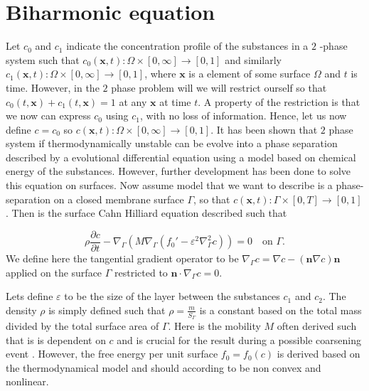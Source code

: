 
\newpage
\section{Biharmonic equation}%
\label{sec:cahn_hilliard_equation}


Let $c_0$ and $c_1$  indicate the concentration profile of the substances in a $2$ -phase system such
that $c_0 \left( \mathbf{x},t \right): \Omega  \times \left[ 0, \infty \right] \to \left[ 0,1 \right]$ and
similarly $c_1 \left( \mathbf{x},t \right): \Omega \times \left[ 0, \infty \right] \to \left[ 0,1 \right]$, where
$\mathbf{x} $ is a element of some surface $\Omega $ and $t$ is time.
However, in the $2$ phase problem will we will restrict ourself so that $c_0\left( t,\mathbf{x} \right) + c_1\left( t,
\mathbf{x} \right) = 1$ at any $\mathbf{x} $ at time $t$. A property of the restriction is that we now can express
$c_0$ using $c_1$, with no loss of information. Hence, let us now define $c = c_0$ so $c \left( \mathbf{x},t \right):
\Omega  \times \left[ 0, \infty \right] \to \left[ 0,1 \right]$. It has been shown that $2$ phase system if
thermodynamically unstable can be evolve
into a phase separation
described by a evolutional differential equation \cite{cahnhilliard1957} using a model based on chemical energy of the
substances. However, further development has been done \cite{yushutin19} to solve this equation on surfaces. Now assume
model that we want to describe is a phase-separation on a closed membrane surface $\Gamma $, so that $c \left( \mathbf{x},t \right):
\Gamma \times \left[ 0, T \right] \to \left[ 0,1 \right]$. Then is the surface Cahn Hilliard equation described such that

\begin{equation}
    \label{eq:cahn1}
\rho \frac{\partial c}{\partial  t}  - \nabla_{\Gamma } \left( M \nabla _{\Gamma } \left( f_{0}'  - \varepsilon ^2
        \nabla^2
_{\Gamma } c \right) \right) = 0  \quad \text{on } \Gamma
.\end{equation}
We define here the tangential gradient operator to be $\nabla _{\Gamma } c = \nabla c - \left( \mathbf{n} \nabla c
\right)\mathbf{n} $ applied on the surface $\Gamma $ restricted to $\mathbf{n} \cdot \nabla _{\Gamma } c = 0$.

Lets define $\varepsilon $ to be the size of the layer between the substances $c_{1}$ and $c_{2}$. The density $\rho $ is
simply defined such that $\rho = \frac{m}{S_{\Gamma }}$ is a constant based on the total mass divided by the total
surface area of $\Gamma $.
Here is the mobility $M$ often derived such that is is dependent on $c$ and is crucial for the result during a possible
coarsening event \cite{yushutin19}.  However, the free energy per unit surface
$f_{0} = f_{0}\left( c \right)$ is derived based on the thermodynamical model and should according to \cite{yushutin19} be non convex and
nonlinear.

